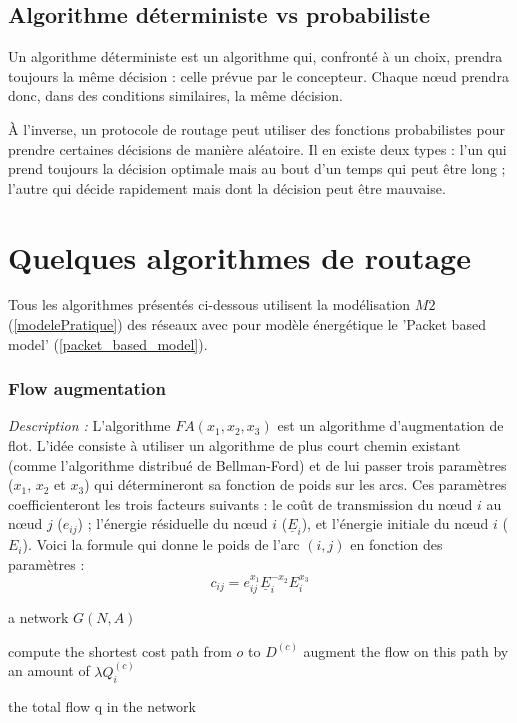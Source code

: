 \subsection{Algorithme déterministe vs probabiliste}
Un algorithme déterministe est un algorithme qui, confronté à un choix, prendra toujours la même décision : celle prévue par le concepteur. Chaque nœud prendra donc, dans des conditions similaires, la même décision.

À l'inverse, un protocole de routage peut utiliser des fonctions probabilistes pour prendre certaines décisions de manière aléatoire. Il en existe deux types : l'un qui prend toujours la décision optimale mais au bout d'un temps qui peut être long ; l'autre qui décide rapidement mais dont la décision peut être mauvaise.



\section{Quelques algorithmes de routage}
Tous les algorithmes présentés ci-dessous utilisent la modélisation $M2$ (\ref{modelePratique}) des réseaux avec pour modèle énergétique le 'Packet based model' (\ref{packet_based_model}).


\subsubsection{Flow augmentation \cite{Chang2000}}

\emph{Description :}
L'algorithme $FA(x_1, x_2, x_3)$ est un algorithme d'augmentation de flot. L'idée consiste à utiliser un algorithme de plus court chemin existant (comme l'algorithme distribué de Bellman-Ford) et de lui passer trois paramètres ($x_1$, $x_2$ et $x_3$) qui détermineront sa fonction de poids sur les arcs. Ces paramètres coefficienteront les trois facteurs suivants : le coût de transmission du nœud $i$ au nœud $j$ ($e_{ij}$) ; l'énergie résiduelle du nœud $i$ ($\underline{E}_i$), et l'énergie initiale du nœud $i$ ($E_i$). Voici la formule qui donne le poids de l'arc $(i,j)$ en fonction des paramètres :
\begin{displaymath}
c_{ij} = e_{ij}^{x_1} \underline{E}_i^{-x_2} E_i^{x_3}
\end{displaymath}

\begin{algorithm}[H]
\caption{$FA(x_1,x_2,x_3)$}
\label{algo_FA}
\begin{algorithmic}
\REQUIRE a network $ G(N,A) $

			\STATE compute the shortest cost path from $o$ to $D^{(c)}$
			\STATE augment the flow on this path by an amount of $\lambda Q_i^{(c)}$
		\ENDFOR
	\ENDFOR
\ENDWHILE

\RETURN the total flow q in the network
\end{algorithmic}
\end{algorithm}


